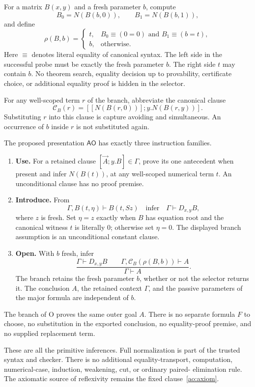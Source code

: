 \documentclass[11pt,letterpaper]{article}
\theoremstyle{definition}
\begin{document}
For a matrix $B(x,y)$ and a fresh parameter $b$, compute
\[
 B_0=N(B(b,0)),\qquad B_1=N(B(b,1)),
\]
and define
\[
 \rho(B,b)=
 \begin{cases}
 t,& B_0\equiv(0=0)\text{ and }B_1\equiv(b=t),\\
 b,&\text{otherwise}.
 \end{cases}
 \tag{Selector}\label{ao:selector}
\]
Here $\equiv$ denotes literal equality of canonical syntax.  The left
side in the successful probe must be exactly the fresh parameter $b$.
The right side $t$ may contain $b$.  No theorem search, equality decision
up to provability, certificate choice, or additional equality proof is
hidden in the selector.

For any well-scoped term $r$ of the branch, abbreviate the canonical clause
\[
 \mathcal C_B(r)=[[N(B(r,0))];y.N(B(r,y))].
\]
Substituting $r$ into this clause is capture avoiding and simultaneous.
An occurrence of $b$ inside $r$ is not substituted again.

The proposed presentation $\mathsf{AO}$ has exactly three instruction
families.
\begin{enumerate}
\item \textbf{Use.} For a retained clause $[\vec A;y.B]\in\Gamma$,
prove its one antecedent when present and infer $N(B(t))$, at any
well-scoped numerical term $t$.  An unconditional clause has no proof
premise.
\item \textbf{Introduce.} From
\[
       \Gamma,B(t,\eta)\vdash B(t,Sz)
       \quad\text{infer}\quad
       \Gamma\vdash D_{x,y}B,
 \tag{I}\label{ao:intro}
\]
where $z$ is fresh.  Set $\eta=z$ exactly when $B$ has equation root and
the canonical witness $t$ is literally $0$; otherwise set $\eta=0$.
The displayed branch assumption is an unconditional constant clause.
\item \textbf{Open.} With $b$ fresh, infer
\[
 \frac{\Gamma\vdash D_{x,y}B\qquad
       \Gamma,\mathcal C_B(\rho(B,b))\vdash A}
      {\Gamma\vdash A}.
 \tag{O}\label{ao:open}
\]
The branch retains the fresh parameter $b$, whether or not the selector
returns it.  The conclusion $A$, the retained context $\Gamma$, and the
passive parameters of the major formula are independent of $b$.
\end{enumerate}
The branch of O proves the same outer goal $A$.  There is no separate
formula $F$ to choose, no substitution in the exported conclusion, no
equality-proof premise, and no supplied replacement term.

These are all the primitive inferences.  Full normalization is part of the
trusted syntax and checker.  There is no additional equality-transport,
computation, numerical-case, induction, weakening, cut, or ordinary paired-
elimination rule.  The axiomatic source of reflexivity remains the fixed
clause~\eqref{ao:axiom}.
\end{document}
